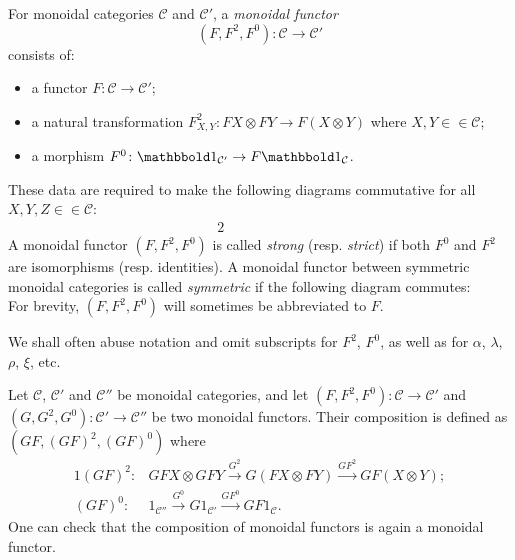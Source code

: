 \documentclass[10pt]{simplearticle}
\newcommand{\tikzinput}[1]{}
\newcommand{\tensorunit}{\mathbbold1}
\begin{document}
\begin{defn}\label{def:monoidal-functor}
 For monoidal categories $\mathcal{C}$
and $\mathcal{C}'$, a \emph{monoidal functor}
\[
(F,F^{2},F^{0})\colon\mathcal{C}\to\mathcal{C}'
\]
consists of:
\begin{itemize}
\item a functor $F\colon\mathcal{C}\to\mathcal{C}'$;
\item a natural transformation $F^{2}_{X,Y}\colon FX\otimes FY\to F(X\otimes Y)$
where $X,Y\in\in\mathcal{C}$;
\item a morphism $F^{0}\colon\tensorunit_{\mathcal{C}'}\to F\tensorunit_{\mathcal{C}}$.
\end{itemize}
These data are required to make the following diagrams commutative
for all $X,Y,Z\in\in\mathcal{C}$:
\[
\tikzinput{d327}
\]
\begin{alignat*}{2}
\tikzinput{d328} & \qquad\qquad & \tikzinput{d328}
\end{alignat*}
A monoidal functor $(F,F^{2},F^{0})$ is called \emph{strong} (resp.
\emph{strict}) if both $F^{0}$ and $F^{2}$ are isomorphisms (resp.
identities). A monoidal functor between symmetric monoidal categories
is called \emph{symmetric} if the following diagram commutes:
\[
\tikzinput{d345}
\]
For brevity, $(F,F^{2},F^{0})$ will sometimes be abbreviated to $F$.
\end{defn}

\begin{rem}
We shall often abuse notation and omit subscripts for $F^{2}$, $F^{0}$,
as well as for $\alpha$, $\lambda$, $\rho$, $\xi$, etc.
\end{rem}

\begin{defn}\label{def:monfun-compos}
Let $\mathcal{C}$, $\mathcal{C}'$ and
$\mathcal{C}''$ be monoidal categories, and let $(F,F^{2},F^{0})\colon\mathcal{C}\to\mathcal{C}'$
and $(G,G^{2},G^{0})\colon\mathcal{C}'\to\mathcal{C}''$ be two monoidal
functors. Their composition is defined as $(GF,(GF)^{2},(GF)^{0})$
where
\begin{alignat*}{1}
(GF)^{2}\colon & GFX\otimes GFY\xrightarrow{G^{2}}G(FX\otimes FY)\xrightarrow{GF^{2}}GF(X\otimes Y);\\
(GF)^{0}\colon & 1_{\mathcal{C}''}\xrightarrow{G^{0}}G1_{\mathcal{C}'}\xrightarrow{GF^{0}}GF1_{\mathcal{C}}.
\end{alignat*}
One can check that the composition of monoidal functors is again a
monoidal functor.
\end{defn}
\end{document}
